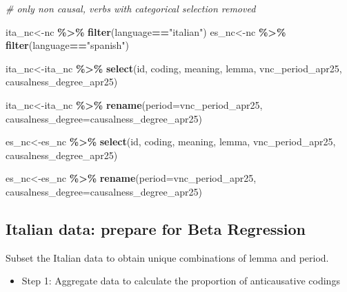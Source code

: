 \documentclass[
]{article}
\newenvironment{Shaded}{\begin{snugshade}}{\end{snugshade}}
\newcommand{\AttributeTok}[1]{\textcolor[rgb]{0.13,0.29,0.53}{#1}}
\newcommand{\CommentTok}[1]{\textcolor[rgb]{0.56,0.35,0.01}{\textit{#1}}}
\newcommand{\FunctionTok}[1]{\textcolor[rgb]{0.13,0.29,0.53}{\textbf{#1}}}
\newcommand{\NormalTok}[1]{#1}
\newcommand{\OtherTok}[1]{\textcolor[rgb]{0.56,0.35,0.01}{#1}}
\newcommand{\SpecialCharTok}[1]{\textcolor[rgb]{0.81,0.36,0.00}{\textbf{#1}}}
\newcommand{\StringTok}[1]{\textcolor[rgb]{0.31,0.60,0.02}{#1}}
\providecommand{\tightlist}{%
  \setlength{\itemsep}{0pt}\setlength{\parskip}{0pt}}
\begin{document}
\begin{Shaded}
\begin{Highlighting}[]
\CommentTok{\# only non causal, verbs with categorical selection removed}

\NormalTok{ita\_nc}\OtherTok{\textless{}{-}}\NormalTok{nc }\SpecialCharTok{\%\textgreater{}\%} \FunctionTok{filter}\NormalTok{(language}\SpecialCharTok{==}\StringTok{"italian"}\NormalTok{)}
\NormalTok{es\_nc}\OtherTok{\textless{}{-}}\NormalTok{nc }\SpecialCharTok{\%\textgreater{}\%} \FunctionTok{filter}\NormalTok{(language}\SpecialCharTok{==}\StringTok{"spanish"}\NormalTok{)}



\NormalTok{ita\_nc}\OtherTok{\textless{}{-}}\NormalTok{ita\_nc }\SpecialCharTok{\%\textgreater{}\%} \FunctionTok{select}\NormalTok{(id, coding, meaning, lemma, vnc\_period\_apr25, causalness\_degree\_apr25)}

\NormalTok{ita\_nc}\OtherTok{\textless{}{-}}\NormalTok{ita\_nc }\SpecialCharTok{\%\textgreater{}\%} \FunctionTok{rename}\NormalTok{(}\AttributeTok{period=}\NormalTok{vnc\_period\_apr25, }\AttributeTok{causalness\_degree=}\NormalTok{causalness\_degree\_apr25)}

\NormalTok{es\_nc}\OtherTok{\textless{}{-}}\NormalTok{es\_nc }\SpecialCharTok{\%\textgreater{}\%} \FunctionTok{select}\NormalTok{(id, coding, meaning, lemma, vnc\_period\_apr25, causalness\_degree\_apr25)}

\NormalTok{es\_nc}\OtherTok{\textless{}{-}}\NormalTok{es\_nc }\SpecialCharTok{\%\textgreater{}\%} \FunctionTok{rename}\NormalTok{(}\AttributeTok{period=}\NormalTok{vnc\_period\_apr25, }\AttributeTok{causalness\_degree=}\NormalTok{causalness\_degree\_apr25)}
\end{Highlighting}
\end{Shaded}

\subsection{Italian data: prepare for Beta
Regression}\label{italian-data-prepare-for-beta-regression}

Subset the Italian data to obtain unique combinations of lemma and
period.

\begin{itemize}
\tightlist
\item
  Step 1: Aggregate data to calculate the proportion of anticausative
  codings
\end{itemize}
\end{document}
